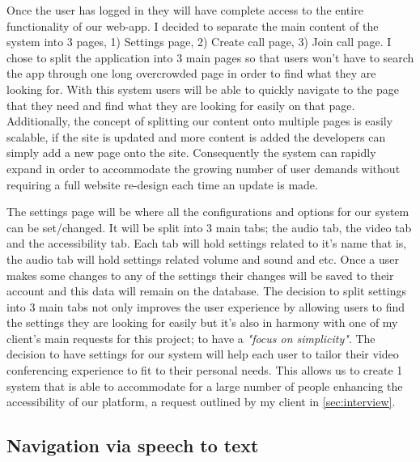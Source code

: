 Once the user has logged in they will have complete access to
the entire functionality of our web-app. I decided to separate
the main content of the system into 3 pages, 1) Settings page,
2) Create call page, 3) Join call page. I chose to split the
application into 3 main pages so that users won't have to
search the app through one long overcrowded page in order to
find what they are looking for. With this system users will be
able to quickly navigate to the page that they need and find
what they are looking for easily on that page. Additionally,
the concept of splitting our content onto multiple pages is
easily scalable, if the site is updated and more content is
added the developers can simply add a new page onto the site.
Consequently the system can rapidly expand in order to
accommodate the growing number of user demands without
requiring a full website re-design each time an update is
made. \\ \vspace{0.2cm}

The settings page will be where all the configurations and
options for our system can be set/changed. It will be split
into 3 main tabs; the audio tab, the video tab and the
accessibility tab. Each tab will hold settings related to it's
name that is, the audio tab will hold settings related volume
and sound and etc. Once a user makes some changes to any of the
settings their changes will be saved to their account and this
data will remain on the database. The decision to split
settings into 3 main tabs not only improves the user experience
by allowing users to find the settings they are looking for
easily but it's also in harmony with one of my client's main
requests for this project; to have a \textit{"focus on
simplicity"}. The decision to have settings for our system
will help each user to tailor their video conferencing
experience to fit to their personal needs. This allows us to
create 1 system that is able to accommodate for a large
number of people enhancing the accessibility of our platform,
a request outlined by my client in \ref{sec:interview}.

\subsection{Navigation via speech to text}

